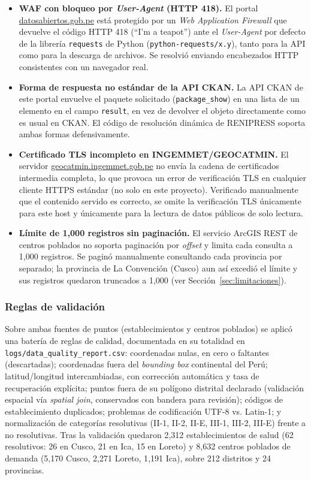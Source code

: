 \documentclass[11pt]{article}
\begin{document}
\begin{itemize}
  \item \textbf{WAF con bloqueo por \textit{User-Agent} (HTTP 418).} El
    portal \url{datosabiertos.gob.pe} está protegido por un
    \textit{Web Application Firewall} que devuelve el código HTTP 418
    (``I'm a teapot'') ante el \textit{User-Agent} por defecto de la
    librería \texttt{requests} de Python (\texttt{python-requests/x.y}),
    tanto para la API como para la descarga de archivos. Se resolvió
    enviando encabezados HTTP consistentes con un navegador real.
  \item \textbf{Forma de respuesta no estándar de la API CKAN.} La API CKAN
    de este portal envuelve el paquete solicitado (\texttt{package\_show})
    en una lista de un elemento en el campo \texttt{result}, en vez de
    devolver el objeto directamente como es usual en CKAN. El código de
    resolución dinámica de RENIPRESS soporta ambas formas defensivamente.
  \item \textbf{Certificado TLS incompleto en INGEMMET/GEOCATMIN.} El
    servidor \url{geocatmin.ingemmet.gob.pe} no envía la cadena de
    certificados intermedia completa, lo que provoca un error de
    verificación TLS en cualquier cliente HTTPS estándar (no solo en este
    proyecto). Verificado manualmente que el contenido servido es
    correcto, se omite la verificación TLS únicamente para este host y
    únicamente para la lectura de datos públicos de solo lectura.
  \item \textbf{Límite de 1{,}000 registros sin paginación.} El servicio
    ArcGIS REST de centros poblados no soporta paginación por
    \textit{offset} y limita cada consulta a 1{,}000 registros. Se paginó
    manualmente consultando cada provincia por separado; la provincia de
    La Convención (Cusco) aun así excedió el límite y sus registros
    quedaron truncados a 1{,}000 (ver Sección~\ref{sec:limitaciones}).
\end{itemize}

\subsubsection{Reglas de validación}

Sobre ambas fuentes de puntos (establecimientos y centros poblados) se
aplicó una batería de reglas de calidad, documentada en su totalidad en
\texttt{logs/data\_quality\_report.csv}: coordenadas nulas, en cero o
faltantes (descartadas); coordenadas fuera del \textit{bounding box}
continental del Perú; latitud/longitud intercambiadas, con corrección
automática y tasa de recuperación explícita; puntos fuera de su polígono
distrital declarado (validación espacial vía \textit{spatial join},
conservados con bandera para revisión); códigos de establecimiento
duplicados; problemas de codificación UTF-8 vs. Latin-1; y normalización de
categorías resolutivas (II-1, II-2, II-E, III-1, III-2, III-E) frente a no
resolutivas. Tras la validación quedaron 2{,}312 establecimientos de salud
(62 resolutivos: 26 en Cusco, 21 en Ica, 15 en Loreto) y 8{,}632 centros
poblados de demanda (5{,}170 Cusco, 2{,}271 Loreto, 1{,}191 Ica), sobre 212
distritos y 24 provincias.
\end{document}
